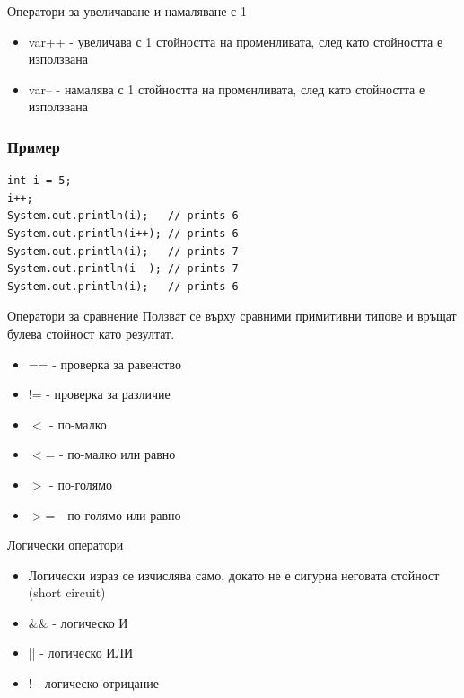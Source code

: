 \documentclass{beamer}
\begin{document}
\begin{frame}{Оператори за увеличаване и намаляване с 1}
  \transdissolve
  \begin{itemize}
  \item var++ - увеличава с 1 стойността на
    променливата, след като стойността е
    използвана
  \item var-- - намалява с 1 стойността на
    променливата, след като стойността е
    използвана
  \end{itemize}
\end{frame}

\begin{frame}[fragile]
  \frametitle{Пример}
  \transdissolve
\begin{lstlisting}
int i = 5;
i++;
System.out.println(i);   // prints 6
System.out.println(i++); // prints 6
System.out.println(i);   // prints 7
System.out.println(i--); // prints 7
System.out.println(i);   // prints 6
\end{lstlisting}
\end{frame}

\begin{frame}{Оператори за сравнение}
  \transdissolve
  Ползват се върху сравними примитивни
  типове и връщат булева стойност като резултат.
  
  \begin{itemize}
  \item == - проверка за равенство
  \item != - проверка за различие
  \item $<$  - по-малко
  \item $<$= - по-малко или равно
  \item $>$  - по-голямо
  \item $>$= - по-голямо или равно
  \end{itemize}
\end{frame}

\begin{frame}{Логически оператори}
  \transdissolve
  \begin{itemize}
  \item   Логически израз се изчислява само, докато
    не е сигурна неговата стойност (short
    circuit)
  \item \&\& - логическо И
  \item || - логическо ИЛИ
  \item ! - логическо отрицание
  \end{itemize}
\end{frame}
\end{document}
